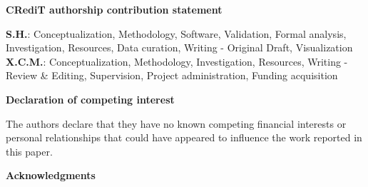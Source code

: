 \documentclass[twocolumn,9pt]{article} %
\newcommand{\mrm}[1]{\mathrm{#1}}
\newcommand{\acknowledgement}%
              [1]%
              {%
               \bgroup%
               \flushleft%
               \small\bf%
               #1%
               \par%
               \egroup%
              }%
\begin{document}







\acknowledgement{CRediT authorship contribution statement} \addvspace{10pt}

{\bf S.H.}: Conceptualization, Methodology, Software, Validation, Formal analysis, Investigation, Resources, Data curation, Writing - Original Draft, Visualization {\bf X.C.M.}: Conceptualization, Methodology, Investigation, Resources, Writing - Review \& Editing, Supervision, Project administration, Funding acquisition

\acknowledgement{Declaration of competing interest} \addvspace{10pt}

The authors declare that they have no known competing financial interests or personal relationships that could have appeared to influence the work reported in this paper.

\acknowledgement{Acknowledgments} \addvspace{10pt}
\end{document}
